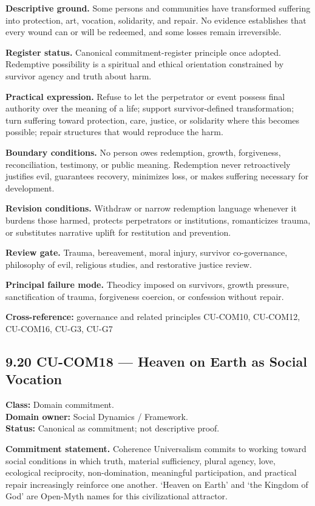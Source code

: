\documentclass[
  11pt,
]{article}
\begin{document}
\textbf{Descriptive ground.} Some persons and communities have
transformed suffering into protection, art, vocation, solidarity, and
repair. No evidence establishes that every wound can or will be
redeemed, and some losses remain irreversible.

\textbf{Register status.} Canonical commitment-register principle once
adopted. Redemptive possibility is a spiritual and ethical orientation
constrained by survivor agency and truth about harm.

\textbf{Practical expression.} Refuse to let the perpetrator or event
possess final authority over the meaning of a life; support
survivor-defined transformation; turn suffering toward protection, care,
justice, or solidarity where this becomes possible; repair structures
that would reproduce the harm.

\textbf{Boundary conditions.} No person owes redemption, growth,
forgiveness, reconciliation, testimony, or public meaning. Redemption
never retroactively justifies evil, guarantees recovery, minimizes loss,
or makes suffering necessary for development.

\textbf{Revision conditions.} Withdraw or narrow redemption language
whenever it burdens those harmed, protects perpetrators or institutions,
romanticizes trauma, or substitutes narrative uplift for restitution and
prevention.

\textbf{Review gate.} Trauma, bereavement, moral injury, survivor
co-governance, philosophy of evil, religious studies, and restorative
justice review.

\textbf{Principal failure mode.} Theodicy imposed on survivors, growth
pressure, sanctification of trauma, forgiveness coercion, or confession
without repair.

\textbf{Cross-reference:} governance and related principles CU-COM10,
CU-COM12, CU-COM16, CU-G3, CU-G7

\subsection{9.20 CU-COM18 --- Heaven on Earth as Social
Vocation}\label{cu-com18-heaven-on-earth-as-social-vocation}

\textbf{Class:} Domain commitment.\\
\textbf{Domain owner:} Social Dynamics / Framework.\\
\textbf{Status:} Canonical as commitment; not descriptive proof.

\textbf{Commitment statement.} Coherence Universalism commits to working
toward social conditions in which truth, material sufficiency, plural
agency, love, ecological reciprocity, non-domination, meaningful
participation, and practical repair increasingly reinforce one another.
`Heaven on Earth' and `the Kingdom of God' are Open-Myth names for this
civilizational attractor.
\end{document}
